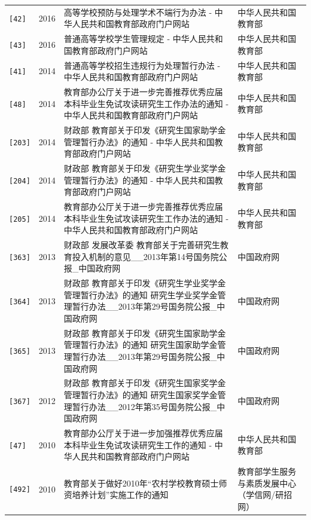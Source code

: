 {\begin{longtable}{p{1.6cm}p{1.1cm}p{6.0cm}p{7.3cm}}
{\texttt{[42]}} & 2016 & 高等学校预防与处理学术不端行为办法 - 中华人民共和国教育部政府门户网站 & 中华人民共和国教育部 \\
{\texttt{[43]}} & 2016 & 普通高等学校学生管理规定 - 中华人民共和国教育部政府门户网站 & 中华人民共和国教育部 \\
{\texttt{[41]}} & 2014 & 普通高等学校招生违规行为处理暂行办法 - 中华人民共和国教育部政府门户网站 & 中华人民共和国教育部 \\
{\texttt{[48]}} & 2014 & 教育部办公厅关于进一步完善推荐优秀应届本科毕业生免试攻读研究生工作办法的通知 - 中华人民共和国教育部政府门户网站 & 中华人民共和国教育部 \\
{\texttt{[203]}} & 2014 & 财政部 教育部关于印发《研究生国家助学金管理暂行办法》的通知 - 中华人民共和国教育部政府门户网站 & 中华人民共和国教育部 \\
{\texttt{[204]}} & 2014 & 财政部 教育部关于印发《研究生学业奖学金管理暂行办法》的通知 - 中华人民共和国教育部政府门户网站 & 中华人民共和国教育部 \\
{\texttt{[205]}} & 2014 & 教育部办公厅关于进一步完善推荐优秀应届本科毕业生免试攻读研究生工作办法的通知 - 中华人民共和国教育部政府门户网站 & 中华人民共和国教育部 \\
{\texttt{[363]}} & 2013 & 财政部 发展改革委 教育部关于完善研究生教育投入机制的意见\_\_2013年第14号国务院公报\_中国政府网 & 中国政府网 \\
{\texttt{[364]}} & 2013 & 财政部 教育部关于印发《研究生学业奖学金管理暂行办法》的通知 研究生学业奖学金管理暂行办法\_\_2013年第29号国务院公报\_中国政府网 & 中国政府网 \\
{\texttt{[365]}} & 2013 & 财政部 教育部关于印发《研究生国家助学金管理暂行办法》的通知 研究生国家助学金管理暂行办法\_\_2013年第29号国务院公报\_中国政府网 & 中国政府网 \\
{\texttt{[367]}} & 2012 & 财政部 教育部关于印发《研究生国家奖学金管理暂行办法》的通知 研究生国家奖学金管理暂行办法\_\_2012年第35号国务院公报\_中国政府网 & 中国政府网 \\
{\texttt{[47]}} & 2010 & 教育部办公厅关于进一步加强推荐优秀应届本科毕业生免试攻读研究生工作的通知 - 中华人民共和国教育部政府门户网站 & 中华人民共和国教育部 \\
{\texttt{[492]}} & 2010 & 教育部关于做好2010年“农村学校教育硕士师资培养计划”实施工作的通知 & 教育部学生服务与素质发展中心（学信网/研招网） \\
\bottomrule
\end{longtable}
}
